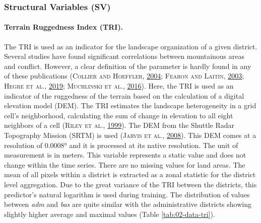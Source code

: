 \documentclass[a4paper,11pt]{article}
\begin{document}
\hypertarget{structural-variables-sv}{%
\subsubsection{Structural Variables (SV)}\label{structural-variables-sv}}

\hypertarget{terrain-ruggedness-index-tri.}{%
\paragraph{Terrain Ruggedness Index (TRI).}\label{terrain-ruggedness-index-tri.}}

The TRI is used as an indicator for the landscape organization of a given district.
Several studies have found significant correlations between mountainous
areas and conflict. However, a clear definition of the parameter is hardly found
in any of these publications \textsc{(\textnormal{\textsc{Collier} and \textsc{Hoeffler}}, \textnormal{\protect\hyperlink{ref-collier2004}{2004}}; \textnormal{\textsc{Fearon} and \textsc{Laitin}}, \textnormal{\protect\hyperlink{ref-fearon2003}{2003}}; \textnormal{\textsc{Hegre} \textsc{et al.}}, \textnormal{\protect\hyperlink{ref-hegre2019}{2019}}; \textnormal{\textsc{Muchlinski} \textsc{et al.}}, \textnormal{\protect\hyperlink{ref-muchlinski2016}{2016}})}.
Here, the TRI is used as an indicator of the ruggedness of the terrain based on
the calculation of a digital elevation model (DEM). The TRI estimates the landscape
heterogeneity in a grid cell's neighborhood, calculating the sum of change in
elevation to all eight neighbors of a cell \textsc{(\textnormal{\textsc{Riley} \textsc{et al.}}, \textnormal{\protect\hyperlink{ref-riley1999}{1999}})}. The DEM from the
Shuttle Radar Topography Mission (SRTM) is used \textsc{(\textnormal{\textsc{Jarvis} \textsc{et al.}}, \textnormal{\protect\hyperlink{ref-jarvis2008}{2008}})}. This DEM comes at
a resolution of 0.0008° and it is processed at its native resolution. The unit of
measurement is in meters. This variable represents a static value and does not
change within the time series. There are no missing values for land areas.
The mean of all pixels within a district is extracted as a zonal statistic for
the district level aggregation. Due to the great variance of the TRI between the
districts, this predictor's natural logarithm is used during training.
The distribution of values between \emph{adm} and \emph{bas} are quite similar with the
administrative districts showing slightly higher average and maximal values
(Table \ref{tab:02-data-tri}).
\end{document}
